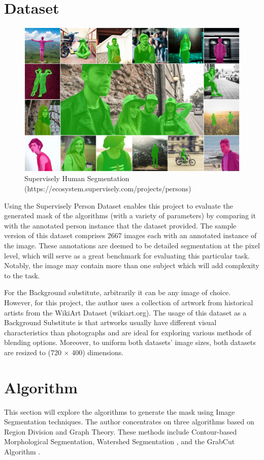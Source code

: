 \documentclass{article}
\begin{document}
\section{Dataset}

\begin{figure}[htbp]
    \centering
    \includegraphics[width=0.6\linewidth]{img/Supervisely.jpg}
    \caption{Supervisely Human Segmentation (https://ecosystem.supervisely.com/projects/persons)}
    \label{fig:supervdb}
\end{figure}

Using the Supervisely Person Dataset \cite{SuperviselyPersons} enables this project to evaluate the generated mask of the algorithms (with a variety of parameters) by comparing it with the annotated person instance that the dataset provided. The sample version of this dataset comprises 2667 images each with an annotated instance of the image. These annotations are deemed to be detailed segmentation at the pixel level, which will serve as a great benchmark for evaluating this particular task. Notably, the image may contain more than one subject which will add complexity to the task.

For the Background substitute, arbitrarily it can be any image of choice. However, for this project, the author uses a collection of artwork from historical artists from the WikiArt Dataset (wikiart.org). The usage of this dataset as a Background Substitute is that artworks usually have different visual characteristics than photographs and are ideal for exploring various methods of blending options. Moreover, to uniform both datasets' image sizes, both datasets are resized to (720 $\times$ 400) dimensions.

\section{Algorithm}

This section will explore the algorithms to generate the mask using Image Segmentation techniques. The author concentrates on three algorithms based on Region Division and Graph Theory. These methods include Contour-based Morphological Segmentation, Watershed Segmentation \cite{Watershed2000}, and the GrabCut Algorithm \cite{Grabcut2004}.
\end{document}
